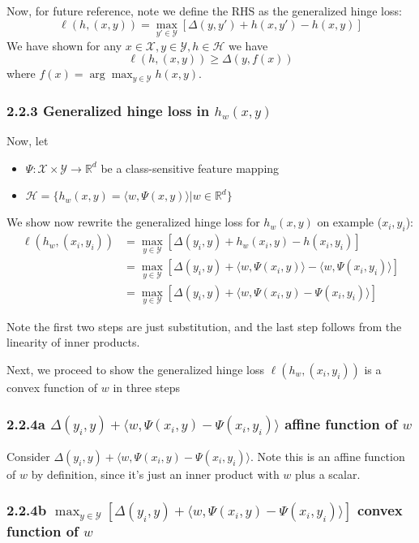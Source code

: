 \documentclass[paper=a4, fontsize=11pt]{scrartcl} %
\numberwithin{equation}{section} %
\numberwithin{figure}{section} %
\numberwithin{table}{section} %
\begin{document}
Now, for future reference, note we define the RHS as the generalized hinge loss:
\[\ell(h, (x,y)) = \max_{y' \in \mathcal{Y}} [\Delta(y, y')+ h(x, y') - h(x,y)]\]
We have shown for any $x \in \mathcal{X}, y \in \mathcal{Y}, h \in \mathcal{H}$ we have
\[\ell(h, (x,y)) \geq \Delta(y, f(x))\]
where $f(x) = \arg \max_{y \in \mathcal{Y}} h(x,y)$.

\subsubsection*{2.2.3 Generalized hinge loss in $h_w(x,y)$}

Now, let
\begin{itemize}
\item $\Psi: \mathcal{X} \times \mathcal{Y} \to \mathbb{R}^d$ be a class-sensitive feature mapping
\item $\mathcal{H} = \{h_w(x,y) = \langle w, \Psi(x, y) \rangle | w \in \mathbb{R}^d\}$
\end{itemize}

We show now rewrite the generalized hinge loss for $h_w(x,y)$ on example ($x_i, y_i$):
\begin{align*}
\ell(h_w, (x_i,y_i)) &= \max_{y \in \mathcal{Y}} [\Delta(y_i, y)+ h_w(x_i, y) - h(x_i,y_i)] \\
	&= \max_{y \in \mathcal{Y}} [\Delta(y_i, y)+ \langle w, \Psi(x_i, y) \rangle -\langle w, \Psi(x_i, y_i) \rangle] \\
	&= \max_{y \in \mathcal{Y}} [\Delta(y_i, y)+ \langle w, \Psi(x_i, y) - \Psi(x_i, y_i) \rangle]
\end{align*}

Note the first two steps are just substitution, and the last step follows from the linearity of inner products.

Next, we proceed to show the generalized hinge loss $\ell(h_w, (x_i,y_i))$ is a convex function of $w$ in three steps

\subsubsection*{2.2.4a $\Delta(y_i, y)+ \langle w, \Psi(x_i, y) - \Psi(x_i, y_i) \rangle$ affine function of $w$}

Consider $\Delta(y_i, y)+ \langle w, \Psi(x_i, y) - \Psi(x_i, y_i) \rangle$. Note this is an affine function of $w$ by definition, since it's just an inner product with $w$ plus a scalar.

\subsubsection*{2.2.4b $\max_{y \in \mathcal{Y}} [\Delta(y_i, y)+ \langle w, \Psi(x_i, y) - \Psi(x_i, y_i) \rangle]$ convex function of $w$}
\end{document}
